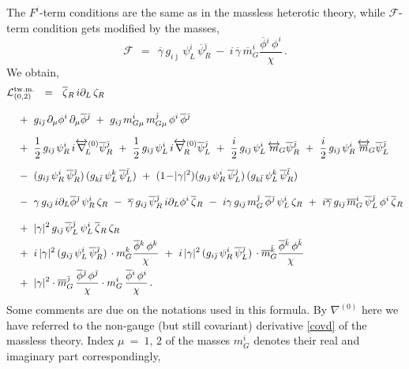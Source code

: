 \documentclass[12pt]{article}
\def\beq{\begin{equation}}
\def\eeq{\end{equation}}
\newcommand{\p}{\partial}
\newcommand{\ov}{\overline}
\newcommand{\mc}[1]{\mathcal{#1}}
\newcommand{\bzr}{\ov{\zeta}{}_R}
\newcommand{\zr}{\zeta_R}
\newcommand{\bgamma}{\ov{\gamma}}
\newcommand{\bpsi}{\ov{\psi}{}}
\newcommand{\bphi}{\ov{\phi}{}}
\newcommand{\ff}{\mc{F}}
\newcommand{\bj}{{\bar \jmath}}
\newcommand{\bk}{{\bar k}}
\newcommand{\bl}{{\bar l}}
\begin{document}
	The $ F^i $-term conditions are the same as in the massless heterotic theory, while $ \ff $-term condition
	gets modified by the masses,
\beq
\label{ffterm}
	\ff ~~=~~ \bgamma\, g_{i\bj}\, \psi_L^i\, \bpsi_R^\bj
	      ~-~ i\, \bgamma\, \ov{m}_G^i \frac{\bphi^i\, \phi^i}{\chi}\,.
\eeq
	We obtain, 
\begin{align}
%
\notag
	\mc{L}_{(0,2)}^\text{tw.m.} & ~~=~~ 
	\bzr\, i\p_L\, \zr \\[3mm]
%
\notag
	&\!\!\!\!\!\!\!\!\!\!\!\!
	~+~ g_{i\bj}\, \p_\mu\phi^i\, \p_\mu\bphi^\bj ~+~ g_{i\bj}\, m_{G\mu}^i\,m_{G\mu}^\bj\, \phi^i\, \bphi^\bj
	\\[2mm]
%
\notag
	&\!\!\!\!\!\!\!\!\!\!\!\!
	~+~ \frac{1}{2}\,g_{i\bj}\,\psi_R^i\,i\overleftrightarrow{\nabla}{}_{\!\!L}^{(0)} \bpsi_R^\bj 
	~+~ \frac{1}{2}\,g_{i\bj}\,\psi_L^i\,i\overleftrightarrow{\nabla}{}_{\!\!R}^{(0)} \bpsi_L^\bj 
	~+~ \frac{i}{2}\,g_{i\bj}\,\psi_L^i\, \overleftrightarrow{m}{}_{\!G} \bpsi_R^\bj
	~+~ \frac{i}{2}\,g_{i\bj}\,\psi_R^i\, \overleftrightarrow{\ov{m}}{}_{\!G} \bpsi_L^\bj
	\\[2mm]
%
\label{sgeom_phys}
	&\!\!\!\!\!\!\!\!\!\!\!\!
	~-~ (g_{i\bj}\, \psi_R^i\, \bpsi_R^\bj)\,(g_{k\bl}\, \psi_L^k\, \bpsi_L^\bl) 
	~+~ (1 \!-\!|\gamma|^2)(g_{i\bj}\, \psi_R^i\, \bpsi_L^\bj)\,(g_{k\bl}\,\psi_L^k\,\bpsi_R^\bl)
	\\[3mm]
%
\notag
	&\!\!\!\!\!\!\!\!\!\!\!\!
	~-~ \gamma\, g_{i\bj}\, i\p_L\bphi^\bj\, \psi_R^i\,\zr 
	~-~ \bgamma\, g_{i\bj}\, \bpsi_R^\bj\, i\p_L\phi^i\, \bzr
	~-~ i\gamma\, g_{i\bj}\, m_G^\bj\,\bphi^\bj\, \psi_L^i\,\zr
	~+~ i\bgamma\, g_{i\bj}\,\ov{m}{}_G^i\, \bpsi_L^\bj\, \phi^i\,\bzr
	\\[3mm]
%
\notag
	&\!\!\!\!\!\!\!\!\!\!\!\!
	~+~ |\gamma|^2\, g_{i\bj}\, \bpsi_L^\bj\, \psi_L^i\, \bzr\, \zr
	\\
%
\notag
	&\!\!\!\!\!\!\!\!\!\!\!\!
	~+~ i\, |\gamma|^2\, (g_{i\bj}\,\psi_L^i\,\bpsi_R^\bj)\, \cdot m_G^k \frac{\bphi^k\, \phi^k}{\chi}
	~+~ i\, |\gamma|^2\, (g_{i\bj}\,\psi_R^i\,\bpsi_L^\bj)\, \cdot \ov{m}{}_G^\bk \frac{\bphi^\bk\,\phi^\bk}{\chi}
	\\
%
\notag
	&\!\!\!\!\!\!\!\!\!\!\!\!
	~+~ |\gamma|^2 \cdot \ov{m}{}_G^\bj\,\frac{\bphi^\bj\,\phi^\bj}{\chi}
			\cdot m_G^i\, \frac{\bphi^i\, \phi^i}{\chi}\,.
\end{align}
	Some comments are due on the notations used in this formula.
	By $ \nabla^{(0)} $ here we have referred to the non-gauge (but still covariant) derivative \eqref{covd}
	of the massless theory.
	Index $ \mu ~=~ 1,\, 2$ of the masses $ m_G^i $ denotes their real and imaginary part correspondingly,
\end{document}
